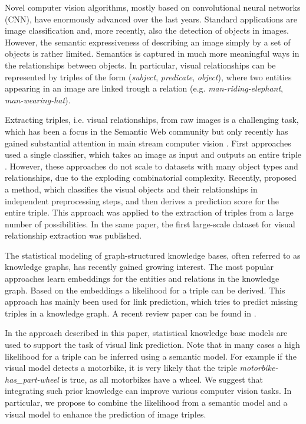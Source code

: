 \documentclass[runningheads,a4paper]{llncs}
\begin{document}
Novel computer vision algorithms, mostly based on convolutional neural networks (CNN), have enormously advanced over the last years. Standard applications are  image classification and, more recently, also the detection of objects in images. However, the semantic expressiveness of describing an image simply by a set of objects is rather limited.  Semantics is captured in much more meaningful ways in the relationships between objects. In particular, visual relationships can be represented by triples of the form (\textit{subject}, \textit{predicate}, \textit{object}), where two entities appearing in an image are linked trough a relation (e.g. \textit{man-riding-elephant}, \textit{man-wearing-hat}). 

Extracting triples, i.e. visual relationships, from raw images is a challenging task, which has been a focus in the Semantic Web community \cite{sw1, sw2, sw3, sw4} but only recently has gained substantial attention in main stream computer vision \cite{phrase1, phrase2, visual}. First approaches used a single classifier, which takes an image as input and outputs an entire triple \cite{phrase1, phrase2}. However, these approaches do not scale to datasets with many object types and relationships, due to the exploding combinatorial complexity. Recently, \cite{visual} proposed a method, which classifies the visual objects and their relationships in independent preprocessing steps, and then derives a prediction score for the entire triple. This approach was applied  to the extraction of triples from a large number of possibilities. In the same paper, the first large-scale dataset for visual relationship extraction was published.

The statistical modeling of graph-structured knowledge bases, often referred to as knowledge graphs, has recently gained growing interest. The most popular approaches learn embeddings for the entities and relations in the knowledge graph. Based on the embeddings a likelihood for a triple can be derived. This approach has mainly been used for link prediction, which tries to predict missing triples in a knowledge graph. A recent review paper can be found in \cite{relational_review}.

In the approach described in this paper, statistical knowledge base models are used to support  the task of visual link prediction. Note that in many cases a high likelihood for a triple can be inferred using a semantic model. For example if the visual model detects a motorbike, it is very likely that the triple \textit{motorbike-has\_part-wheel} is true, as all motorbikes have a wheel. We suggest that integrating such prior knowledge can improve various computer vision tasks. In particular,  we propose to combine the likelihood from a semantic model and a visual model to enhance the prediction of image triples. 
\end{document}
